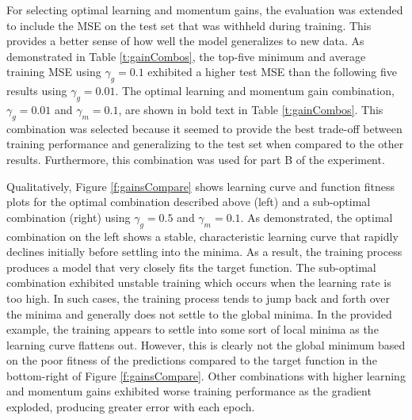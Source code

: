 \documentclass[11pt,pdftex,portrait,letterpaper]{article}
\begin{document}
For selecting optimal learning and momentum gains, the evaluation was extended to include the MSE on the test set that was withheld during training. This provides a better sense of how well the model generalizes to new data. As demonstrated in Table \ref{t:gainCombos}, the top-five minimum and average training MSE using $\gamma_g=0.1$ exhibited a higher test MSE than the following five results using $\gamma_g=0.01$. The optimal learning and momentum gain combination, $\gamma_g=0.01$ and $\gamma_m=0.1$, are shown in bold text in Table \ref{t:gainCombos}. This combination was selected because it seemed to provide the best trade-off between training performance and generalizing to the test set when compared to the other results. Furthermore, this combination was used for part B of the experiment.

Qualitatively, Figure \ref{f:gainsCompare} shows learning curve and function fitness plots for the optimal combination described above (left) and a sub-optimal combination (right) using $\gamma_g=0.5$ and $\gamma_m=0.1$. As demonstrated, the optimal combination on the left shows a stable, characteristic learning curve that rapidly declines initially before settling into the minima. As a result, the training process produces a model that very closely fits the target function. The sub-optimal combination exhibited unstable training which occurs when the learning rate is too high. In such cases, the training process tends to jump back and forth over the minima and generally does not settle to the global minima. In the provided example, the training  appears to settle into some sort of local minima as the learning curve flattens out. However, this is clearly not the global minimum based on the poor fitness of the predictions compared to the target function in the bottom-right of Figure \ref{f:gainsCompare}. Other combinations with higher learning and momentum gains exhibited worse training performance as the gradient exploded, producing greater error with each epoch.
\end{document}
